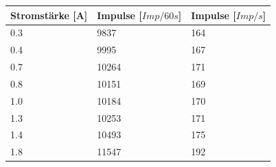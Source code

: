 \begin{minipage}{\linewidth}
\begin{table}[H]
\begin{tabular}{ll}
    \end{tabular}
    \label{tab:7a}
    \end{table}
    \end{minipage}

    \begin{minipage}{\linewidth}
        \begin{table}[H]
            \centering
        
        \begin{tabular}{lll}
            \toprule
            Stromstärke [A] & Impulse [$Imp/60s$] & Impulse [$Imp/s$]\\
            \midrule
            0.3 &  9837  & 164 \\ 
            0.4 &  9995  & 167 \\
            0.7 &  10264 & 171 \\
            0.8 &  10151 & 169 \\
            1.0 &  10184 & 170 \\
            1.3 &  10253 & 171 \\
            1.4 &  10493 & 175 \\
            1.8 &  11547 & 192 \\
            \bottomrule
            
        \end{tabular}
        \label{tab:7d2}
        \end{table}
        \end{minipage}

       

